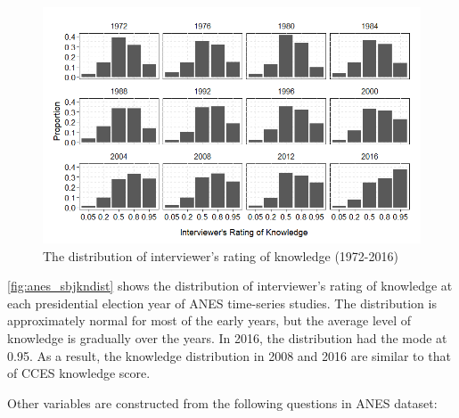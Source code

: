\begin{figure}[ht!!!]
    \caption{The distribution of interviewer's rating of knowledge (1972-2016)}
    \label{fig:anes_sbjkndist}
    \includegraphics[width=\linewidth]{../outputs/anes_sbjkndist.png}
\end{figure}

\par \autoref{fig:anes_sbjkndist} shows the distribution of interviewer's rating of knowledge at each presidential election year of ANES time-series studies. The distribution is approximately normal for most of the early years, but the average level of knowledge is gradually over the years. In 2016, the distribution had the mode at 0.95. As a result, the knowledge distribution in 2008 and 2016 are similar to that of CCES knowledge score.    

\par Other variables are constructed from the following questions in ANES dataset:

